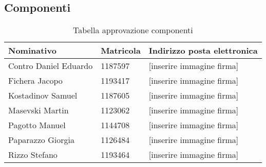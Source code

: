 \documentclass[../piano_di_progetto.tex]{subfiles}
\begin{document}
\newpage

\subsection{Componenti}%
\label{sub:comp}

\begin{table}[!ht]
	\centering
	\begin{tabular}{|l|l|l|}
		\hline
		\rowcolor{lightgray}
		\textbf{Nominativo} & \textbf{Matricola} & \textbf{Indirizzo posta elettronica} \\ 
		\hline
		Contro Daniel Eduardo & 1187597 & [inserire immagine firma] \\ 
		\hline
		Fichera Jacopo & 1193417  & [inserire immagine firma] \\ 
		\hline
		Kostadinov Samuel & 1187605 & [inserire immagine firma] \\ 
		\hline
		Masevski Martin & 1123062 & [inserire immagine firma] \\ 
		\hline
		Pagotto Manuel & 1144708 & [inserire immagine firma]  \\ 
		\hline
		Paparazzo Giorgia & 1126484 & [inserire immagine firma] \\ 
		\hline
		Rizzo Stefano & 1193464 & [inserire immagine firma] \\ 
		\hline

	\end{tabular}
		\caption{Tabella approvazione componenti}
\end{table}
\end{document}
